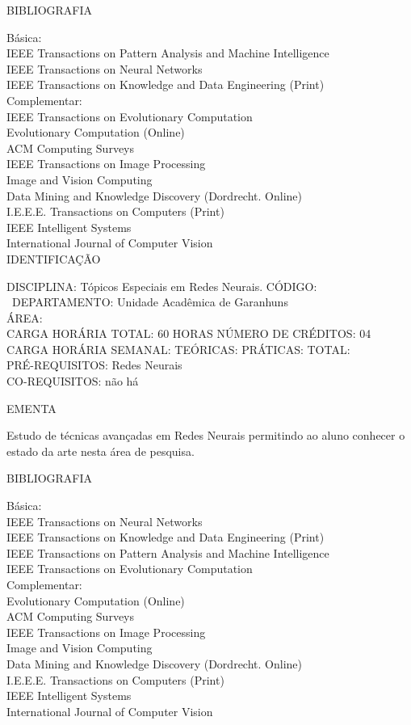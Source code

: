 \documentclass[
	12pt,				%
	openright,			%
  oneside,     %
	a4paper,			%
	english,			%
	french,				%
	spanish,			%
	brazil				%
	]{abntex2}
\begin{document}
\begin{apendicesenv}
BIBLIOGRAFIA 

Básica:\\
IEEE Transactions on Pattern Analysis and Machine Intelligence\\
IEEE Transactions on Neural Networks\\
IEEE Transactions on Knowledge and Data Engineering (Print)\\
Complementar:\\
IEEE Transactions on Evolutionary Computation\\
Evolutionary Computation (Online)\\
ACM Computing Surveys\\
IEEE Transactions on Image Processing\\
Image and Vision Computing\\
Data Mining and Knowledge Discovery (Dordrecht. Online)\\
I.E.E.E. Transactions on Computers (Print)\\
IEEE Intelligent Systems\\
International Journal of Computer Vision\\

\newpage IDENTIFICAÇÃO

DISCIPLINA: Tópicos Especiais em Redes Neurais. CÓDIGO:\\\
DEPARTAMENTO: Unidade Acadêmica de Garanhuns\\ ÁREA: \\
CARGA HORÁRIA TOTAL: 60 HORAS NÚMERO DE CRÉDITOS: 04\\
CARGA HORÁRIA SEMANAL: TEÓRICAS: PRÁTICAS: TOTAL: \\
PRÉ-REQUISITOS: Redes Neurais\\
CO-REQUISITOS: não há

EMENTA 

Estudo de técnicas avançadas em Redes Neurais permitindo ao aluno
conhecer o estado da arte nesta área de pesquisa.

BIBLIOGRAFIA 

Básica:\\
IEEE Transactions on Neural Networks\\
IEEE Transactions on Knowledge and Data Engineering (Print)\\
IEEE Transactions on Pattern Analysis and Machine Intelligence\\
IEEE Transactions on Evolutionary Computation\\
Complementar:\\
Evolutionary Computation (Online)\\
ACM Computing Surveys\\
IEEE Transactions on Image Processing\\
Image and Vision Computing\\
Data Mining and Knowledge Discovery (Dordrecht. Online)\\
I.E.E.E. Transactions on Computers (Print)\\
IEEE Intelligent Systems\\
International Journal of Computer Vision\\


\end{apendicesenv}
\end{document}
